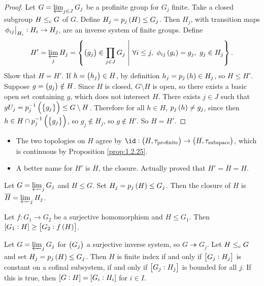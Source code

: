 \begin{proof}
Let $ G = \varprojlim_{j \in J} G_j $ be a profinite group for $ G_j $ finite. Take a closed subgroup $ H \le_{\mathrm{c}} G $ of $ G $. Define $ H_j = p_j\br{H} \le G_j $. Then $ H_j $, with transition maps $ \left. \phi_{ij} \right|_{H_i} : H_i \to H_j $, are an inverse system of finite groups. Define
$$ H' = \varprojlim_j H_j = \cbr{\br{g_j} \in \prod_{j \in J} G_j \st \forall i \le j, \ \phi_{ij}\br{g_i} = g_j, \ g_j \in H_j}. $$
Show that $ H = H' $. If $ h = \br{h_j} \in H $, by definition $ h_j = p_j\br{h} \in H_j $, so $ H \le H' $. Suppose $ g = \br{g_j} \notin H $. Since $ H $ is closed, $ G \setminus H $ is open, so there exists a basic open set containing $ g $, which does not intersect $ H $. There exists $ j \in J $ such that $ gU_j = p_j^{-1}\br{\cbr{g_j}} \le G \setminus H $. Therefore for all $ h \in H $, $ p_j\br{h} \ne g_j $, since then $ h \in H \cap p_j^{-1}\br{\cbr{g_j}} $, so $ g_j \notin H_j $, so $ g \notin H' $. So $ H = H' $.
\end{proof}

\begin{remark}
\hfill
\begin{itemize}
\item The two topologies on $ H $ agree by $ \id : \br{H, \tau_{\text{profinite}}} \to \br{H, \tau_{\text{subspace}}} $, which is continuous by Proposition \ref{prop:1.2.25}.
\item A better name for $ H' $ is $ \overline{H} $, the closure. Actually proved that $ H' = \overline{H} = H $.
\end{itemize}
\end{remark}

\begin{proposition}
Let $ G = \varprojlim_j G_j $ and $ H \le G $. Set $ H_j = p_j\br{H} \le G_j $. Then the closure of $ H $ is $ \overline{H} = \varprojlim_j H_j $.
\end{proposition}

\begin{lemma}
Let $ f : G_1 \to G_2 $ be a surjective homomorphism and $ H \le G_1 $. Then $ \sbr{G_1 : H} \ge \sbr{G_2 : f\br{H}} $.
\end{lemma}

\begin{proposition}
Let $ G = \varprojlim_j G_j $ for $ \br{G_j} $ a surjective inverse system, so $ G \twoheadrightarrow G_j $. Let $ H \le_{\mathrm{c}} G $ and set $ H_j = p_j\br{H} \le G_j $. Then $ H $ is finite index if and only if $ \sbr{G_j : H_j} $ is constant on a cofinal subsystem, if and only if $ \sbr{G_j : H_j} $ is bounded for all $ j $. If this is true, then $ \sbr{G : H} = \sbr{G_i : H_i} $ for $ i \in I $.
\end{proposition}

